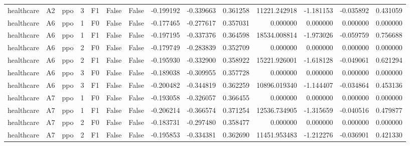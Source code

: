 \begin{tabular}{lllrlllrrrrrrr}
healthcare &      A2 &       ppo &     3 &  F1 &           False &            False & -0.199192 & -0.339663 & 0.361258 &     11221.242918 &          -1.181153 &       -0.035892 &            0.431059 \\
healthcare &      A6 &       ppo &     1 &  F0 &           False &            False & -0.177465 & -0.277617 & 0.357031 &         0.000000 &           0.000000 &        0.000000 &            0.000000 \\
healthcare &      A6 &       ppo &     1 &  F1 &           False &            False & -0.197195 & -0.337376 & 0.364598 &     18534.008814 &          -1.973026 &       -0.059759 &            0.756688 \\
healthcare &      A6 &       ppo &     2 &  F0 &           False &            False & -0.179749 & -0.283839 & 0.352709 &         0.000000 &           0.000000 &        0.000000 &            0.000000 \\
healthcare &      A6 &       ppo &     2 &  F1 &           False &            False & -0.195930 & -0.332900 & 0.358922 &     15221.926001 &          -1.618128 &       -0.049061 &            0.621294 \\
healthcare &      A6 &       ppo &     3 &  F0 &           False &            False & -0.189038 & -0.309955 & 0.357728 &         0.000000 &           0.000000 &        0.000000 &            0.000000 \\
healthcare &      A6 &       ppo &     3 &  F1 &           False &            False & -0.200482 & -0.344819 & 0.362259 &     10896.019340 &          -1.144407 &       -0.034864 &            0.453136 \\
healthcare &      A7 &       ppo &     1 &  F0 &           False &            False & -0.193058 & -0.326057 & 0.366455 &         0.000000 &           0.000000 &        0.000000 &            0.000000 \\
healthcare &      A7 &       ppo &     1 &  F1 &           False &            False & -0.206214 & -0.366574 & 0.371254 &     12536.734905 &          -1.315659 &       -0.040516 &            0.479877 \\
healthcare &      A7 &       ppo &     2 &  F0 &           False &            False & -0.183731 & -0.297480 & 0.358477 &         0.000000 &           0.000000 &        0.000000 &            0.000000 \\
healthcare &      A7 &       ppo &     2 &  F1 &           False &            False & -0.195853 & -0.334381 & 0.362690 &     11451.953483 &          -1.212276 &       -0.036901 &            0.421330 \\

\end{tabular}
